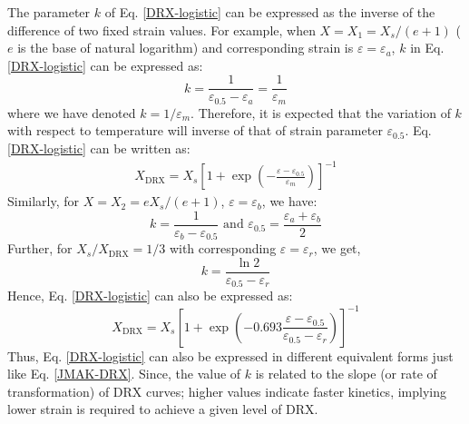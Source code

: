 \documentclass[a4paper, 11pt, dvipsnames]{article}
\begin{document}
The parameter $k$ of Eq. \eqref{DRX-logistic} can be expressed as the inverse of the difference of two fixed strain values. For example, when $X = X_1 = X_s/(e+1)$ ($e$ is the base of natural logarithm) and corresponding strain is $\varepsilon = \varepsilon_a$, $k$ in Eq. \eqref{DRX-logistic} can be expressed as:
\begin{equation*}
k = \frac{1}{\varepsilon_{0.5}-\varepsilon_a} = \frac{1}{\varepsilon_m}
\end{equation*}
where we have denoted $k = 1/\varepsilon_m$. Therefore, it is expected that the variation of $k$ with respect to temperature will inverse of that of strain parameter $\varepsilon_{0.5}$. Eq. \eqref{DRX-logistic} can be written as:
\begin{equation*}
\begin{aligned}
X_\text{DRX} = X_s \left[1 + \exp\left(-\frac{\varepsilon-\varepsilon_{0.5}}{\varepsilon_m}\right)\right]^{-1} 
\end{aligned}
\end{equation*}
Similarly, for $X = X_2 = eX_s/(e+1)$, $\varepsilon = \varepsilon_b$, we have:
\begin{equation*}
k = \frac{1}{\varepsilon_{b}-\varepsilon_{0.5}}\,\, \text{and} \,\, \varepsilon_{0.5} = \frac{\varepsilon_a + \varepsilon_b}{2}
\end{equation*}
Further, for $X_s/X_{\text{DRX}} = 1/3$ with corresponding $\varepsilon = \varepsilon_r$, we get, 
\begin{equation*}
k = \frac{\ln 2}{\varepsilon_{0.5}-\varepsilon_r}
\end{equation*}
Hence, Eq. \eqref{DRX-logistic} can also be expressed as:
\begin{equation*}
X_\text{DRX} = X_s \left[1 + \exp\left(-0.693\frac{\varepsilon-\varepsilon_{0.5}}{\varepsilon_{0.5}-\varepsilon_r}\right)\right]^{-1} 
\end{equation*}
Thus, Eq. \eqref{DRX-logistic} can also be expressed in different equivalent forms just like Eq. \eqref{JMAK-DRX}. Since, the value of $k$ is related to the slope (or rate of transformation) of DRX curves; higher values indicate faster kinetics, implying lower strain is required to achieve a given level of DRX.  
\end{document}
